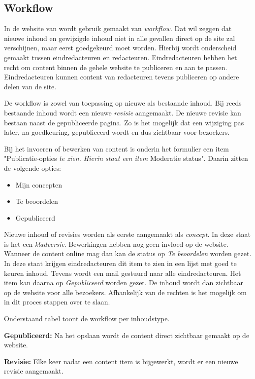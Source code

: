 \clearpage
\subsection{Workflow}\label{workflow}

In de website van \drupalpath wordt gebruik gemaakt van \emph{workflow}. Dat wil zeggen dat nieuwe inhoud en gewijzigde inhoud niet in alle gevallen direct op de site zal verschijnen, maar eerst goedgekeurd moet worden. Hierbij wordt onderscheid gemaakt tussen eindredacteuren en redacteuren. Eindredacteuren hebben het recht om content binnen de gehele website te publiceren en aan te passen. Eindredacteuren kunnen content van redacteuren tevens publiceren op andere delen van de site.

De workflow is zowel van toepassing op nieuwe als bestaande inhoud. Bij reeds bestaande inhoud wordt een nieuwe \emph{revisie} aangemaakt. De nieuwe revisie kan bestaan naast de gepubliceerde pagina. Zo is het mogelijk dat een wijziging pas later, na goedkeuring, gepubliceerd wordt en dus zichtbaar voor bezoekers.

Bij het invoeren of bewerken van content is onderin het formulier een item "Publicatie-opties\emph{ te zien. Hierin staat een item }Moderatie status". Daarin zitten de volgende opties:
\begin{itemize}
\item Mijn concepten
\item Te beoordelen
\item Gepubliceerd
\end{itemize}

Nieuwe inhoud of revisies worden als eerste aangemaakt als \emph{concept}. In deze staat is het een \emph{kladversie}. Bewerkingen hebben nog geen invloed op de website. Wanneer de content online mag dan kan de status op \emph{Te beoordelen} worden gezet. In deze staat krijgen eindredacteuren dit item te zien in een lijst met goed te keuren inhoud. Tevens wordt een mail gestuurd naar alle eindredacteuren. Het item kan daarna op \emph{Gepubliceerd} worden gezet. De inhoud wordt dan zichtbaar op de website voor alle bezoekers. Afhankelijk van de rechten is het mogelijk om in dit proces stappen over te slaan.


Onderstaand tabel toont de workflow per inhoudstype. 

\textbf{Gepubliceerd:} Na het opslaan wordt de content direct zichtbaar gemaakt op de website.

\textbf{Revisie:} Elke keer nadat een content item is bijgewerkt, wordt er een nieuwe revisie aangemaakt.


